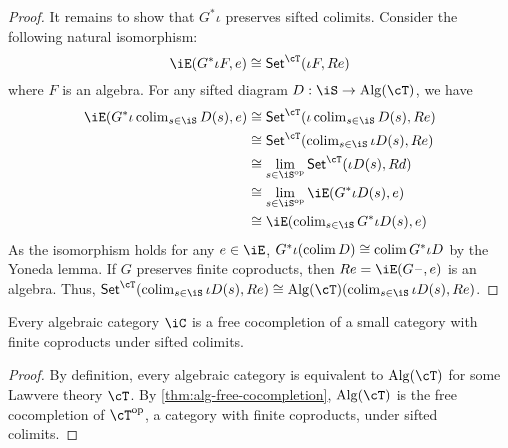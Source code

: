 \documentclass{zett}
\begin{document}
\begin{proof}
  It remains to show that $G^{*}\iota$ preserves sifted colimits.
  Consider the following natural isomorphism:
  \[
    \iE(G^{*}\iota F, e) \iso \CSet^{\cT}(\iota F, Re)
  \]
  where $F$ is an algebra.
  For any sifted diagram $D : \iS \to \Alg(\cT)$, we have
  \begin{align}
    \iE(G^{*}\iota\colim_{s \in \iS} D(s), e) &\iso \CSet^{\cT}(\iota\colim_{s \in \iS} D(s), Re)\\
                                       &\iso \CSet^{\cT}(\colim_{s \in \iS} \iota D(s), Re)\\
                                       &\iso \lim_{s \in \iS\op}\CSet^{\cT}(\iota D(s), Rd)\\
                                       &\iso \lim_{s \in \iS\op}\iE(G^{*}\iota D(s), e)\\
                                       &\iso \iE(\colim_{s \in \iS}G^{*}\iota D(s), e)
  \end{align}
  As the isomorphism holds for any $e \in \iE$, $G^{*}\iota(\operatorname{colim} D) \cong \operatorname{colim} G^{*}\iota D$ by the Yoneda lemma.
  If $G$ preserves finite coproducts, then $Re = \iE(G\blank, e)$ is an algebra.
  Thus, $\CSet^{\cT}(\colim_{s \in \iS} \iota D(s), Re) \iso \Alg(\cT)(\colim_{s \in \iS} \iota D(s), Re)$.
\end{proof}

\begin{cor}
  Every algebraic category $\iC$ is a free cocompletion of a small category with finite coproducts under sifted colimits.
\end{cor}
\begin{proof}
  By definition, every algebraic category is equivalent to $\Alg(\cT)$ for some Lawvere theory $\cT$.
  By \cref{thm:alg-free-cocompletion}, $\Alg(\cT)$ is the free cocompletion of $\cT\op$, a category with finite coproducts, under sifted colimits.
\end{proof}
\end{document}
